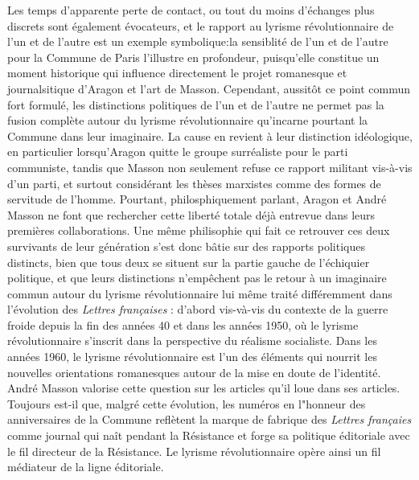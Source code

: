 Les temps d'apparente perte de contact, ou tout du moins d'échanges plus discrets sont également évocateurs, et le rapport au lyrisme révolutionnaire de l'un et de l'autre est un exemple symbolique:la sensiblité de l'un et de l'autre pour la Commune de Paris l'illustre en profondeur, puisqu'elle constitue un moment historique qui influence directement le projet romanesque et journalsitique d'Aragon et l'art de Masson. Cependant, aussitôt ce point commun fort formulé, les distinctions politiques de l'un et de l'autre ne permet pas la fusion complète autour du lyrisme révolutionnaire qu'incarne pourtant la Commune dans leur imaginaire. La cause en revient à leur distinction idéologique, en particulier lorsqu'Aragon quitte le groupe surréaliste pour le parti communiste, tandis que Masson non seulement refuse ce rapport militant vis-à-vis d'un parti, et surtout considérant les thèses marxistes comme des formes de servitude de l'homme. Pourtant, philosphiquement parlant, Aragon et André Masson ne font que rechercher cette liberté totale déjà entrevue dans leurs premières collaborations. Une même philisophie qui fait ce retrouver ces deux survivants de leur génération s'est donc bâtie sur des rapports politiques distincts, bien que tous deux se situent sur la partie gauche de l'échiquier politique, et que leurs distinctions n'empêchent pas le retour à un imaginaire commun autour du lyrisme révolutionnaire lui même traité différemment dans l'évolution des \emph{Lettres françaises} : d'abord vis-và-vis du contexte de la guerre froide depuis la fin des années 40 et dans les années 1950, où le lyrisme révolutionnaire s'inscrit dans la perspective du réalisme socialiste. Dans les années 1960, le lyrisme révolutionnaire est l'un des éléments qui nourrit les nouvelles orientations romanesques autour de la mise en doute de l'identité. André Masson valorise cette question sur les articles qu'il loue dans ses articles. Toujours est-il que, malgré cette évolution, les numéros en l"honneur des anniversaires de la Commune reflètent la marque de fabrique des \emph{Lettres françaies} comme journal qui naît pendant la Résistance et forge sa politique éditoriale avec le fil directeur de la Résistance. Le lyrisme révolutionnaire opère ainsi un fil médiateur de la ligne éditoriale.


